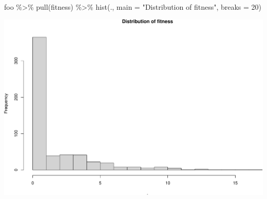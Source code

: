 \documentclass[
  ignorenonframetext,
]{beamer}
\newenvironment{Shaded}{\begin{snugshade}}{\end{snugshade}}
\newcommand{\AttributeTok}[1]{\textcolor[rgb]{0.77,0.63,0.00}{#1}}
\newcommand{\DecValTok}[1]{\textcolor[rgb]{0.00,0.00,0.81}{#1}}
\newcommand{\FunctionTok}[1]{\textcolor[rgb]{0.00,0.00,0.00}{#1}}
\newcommand{\NormalTok}[1]{#1}
\newcommand{\SpecialCharTok}[1]{\textcolor[rgb]{0.00,0.00,0.00}{#1}}
\newcommand{\StringTok}[1]{\textcolor[rgb]{0.31,0.60,0.02}{#1}}
\begin{document}
\begin{frame}[fragile]{}
\protect\hypertarget{section-41}{}
\tiny

\begin{Shaded}
\begin{Highlighting}[]
\NormalTok{foo }\SpecialCharTok{\%\textgreater{}\%} \FunctionTok{pull}\NormalTok{(fitness) }\SpecialCharTok{\%\textgreater{}\%} \FunctionTok{hist}\NormalTok{(., }\AttributeTok{main =} \StringTok{"Distribution of fitness"}\NormalTok{, }\AttributeTok{breaks =} \DecValTok{20}\NormalTok{)}
\end{Highlighting}
\end{Shaded}

\includegraphics{week14p2_files/figure-beamer/unnamed-chunk-38-1.pdf}
\end{frame}
\end{document}
